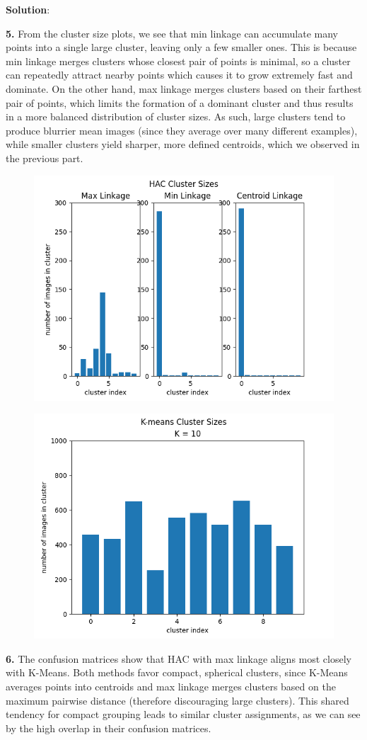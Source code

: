 \documentclass[submit]{../harvardml}
\newenvironment{solution}{
    \vspace{2mm}
    \color{blue}\noindent\textbf{Solution}:
}{}
\begin{document}
\begin{solution}
\begin{figure}[H]
    \end{figure}
    \textbf{5.} From the cluster size plots, we see that min linkage can accumulate many points into a single large cluster, leaving only a few smaller ones. This is because min linkage merges clusters whose closest pair of points is minimal, so a cluster can repeatedly attract nearby points which causes it to grow extremely fast and dominate. On the other hand, max linkage merges clusters based on their farthest pair of points, which limits the formation of a dominant cluster and thus results in a more balanced distribution of cluster sizes. As such, large clusters tend to produce blurrier mean images (since they average over many different examples), while smaller clusters yield sharper, more defined centroids, which we observed in the previous part.
    \begin{figure}[H]
        \centering
        \includegraphics[width=0.8\linewidth]{hw4/img_output/p2.5a.png}
    \end{figure}
    \begin{figure}[H]
        \centering
        \includegraphics[width=0.8\linewidth]{hw4/img_output/p2.5b.png}
    \end{figure}
    \textbf{6.} The confusion matrices show that HAC with max linkage aligns most closely with K-Means. Both methods favor compact, spherical clusters, since K-Means averages points into centroids and max linkage merges clusters based on the maximum pairwise distance (therefore discouraging large clusters). This shared tendency for compact grouping leads to similar cluster assignments, as we can see by the high overlap in their confusion matrices.
 

\end{solution}
\end{document}
